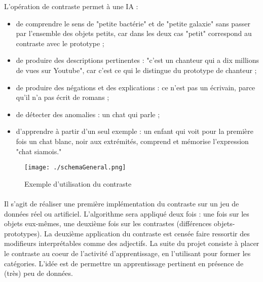 \documentclass[a4paper,10pt]{article}
\begin{document}
L’opération de contraste permet à une IA :

\renewcommand{\labelitemi}{\textbullet}

\begin{itemize}
 \item de comprendre le sens de "petite bactérie" et de "petite galaxie" sans passer par l’ensemble des objets petits, car dans les deux cas "petit" correspond au contraste avec le prototype ;
 \item de produire des descriptions pertinentes : "c’est un chanteur qui a dix millions de vues sur Youtube", car c’est ce qui le distingue du prototype de chanteur ;
 \item de produire des négations et des explications : ce n’est pas un écrivain, parce qu’il n’a pas écrit de romans ;
 \item de détecter des anomalies : un chat qui parle ;
 \item d'apprendre à partir d’un seul exemple : un enfant qui voit pour la première fois un chat blanc, noir aux extrémités, comprend et mémorise l’expression "chat siamois."
\end{itemize}

\begin{figure}[h]
	\begin{center}
    \texttt{[image: ./schemaGeneral.png]}
    \end{center}
    \caption{Exemple d'utilisation du contraste}
\end{figure}

\paragraph{}

Il s’agit de réaliser une première implémentation du contraste sur un jeu de données réel ou artificiel. L’algorithme sera appliqué deux fois : une fois sur les objets eux-mêmes, une deuxième fois sur les contrastes (différences objets-prototypes). La deuxième application du contraste est censée faire ressortir des modifieurs interprétables comme des adjectifs.
La suite du projet consiste à placer le contraste au coeur de l’activité d’apprentissage, en l’utilisant pour former les catégories. L’idée est de permettre un apprentissage pertinent en présence de (très) peu de données.

\paragraph{}
\end{document}
